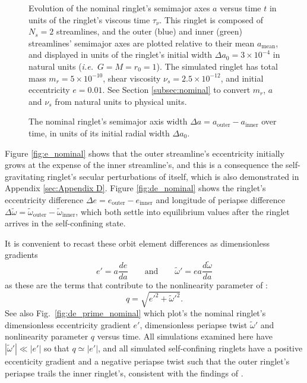 \documentclass[preprint]{aastex62}
\begin{document}
\begin{figure}
\caption{Evolution of the nominal ringlet's semimajor axes $a$
versus time $t$ in units of the ringlet's viscous time $\tau_\nu$.
This ringlet is composed of $N_s=2$ streamlines,
and the outer (blue) and inner (green) streamlines' semimajor axes are plotted relative
to their mean $a_{\text{mean}}$, and displayed in units of the ringlet's
initial width $\Delta a_0 = 3\times10^{-4}$ in natural units ({\it i.e.}\ $G=M=r_0=1$).
The simulated ringlet has total mass $m_r=5\times10^{-10}$, shear viscosity $\nu_s=2.5\times10^{-12}$,
and initial eccentricity $e=0.01$. See Section \ref{subsec:nominal} to convert
$m_r$, $a$ and $\nu_s$ from natural units to physical units.
\label{fig:a_nominal}}
\end{figure}

\begin{figure}
\caption{
\label{fig:da_nominal}
The nominal ringlet's semimajor axis width $\Delta a = a_{\text{outer}} - a_{\text{inner}}$ over time, 
in units of its initial radial width $\Delta a_0$.}
\end{figure}

Figure \ref{fig:e_nominal} shows that the outer streamline's eccentricity initially grows at the
expense of the inner streamline's, and this is a consequence the self-gravitating ringlet's
secular perturbations of itself, which is also demonstrated in Appendix \ref{sec:Appendix D}. 
Figure \ref{fig:de_nominal} shows
the ringlet's eccentricity difference $\Delta e = e_{\text{outer}} - e_{\text{inner}}$
and longitude of periapse difference
$\Delta\tilde{\omega} = \tilde{\omega}_{\text{outer}} - \tilde{\omega}_{\text{inner}}$,
which both settle into equilibrium values after the ringlet arrives in the self-confining
state.

It is convenient to recast these orbit element differences as dimensionless gradients
\begin{equation}
    \label{eqn:e_prime}
    e' = a\frac{de}{da}
    \qquad\mbox{and}\qquad
    \tilde{\omega}' = ea\frac{d\tilde{\omega}}{da}
\end{equation}
as these are the terms that contribute to the nonlinearity parameter of \cite{BGT83}:
\begin{equation}
    \label{eqn:q}
    q = \sqrt{e'^2 + \tilde{\omega}'^2}.
\end{equation}
See also Fig.\ \ref{fig:de_prime_nominal} which plot's the nominal
ringlet's dimensionless eccentricity gradient $e'$, dimensionless periapse twist $\tilde{\omega}'$
and nonlinearity parameter $q$ versus time. All simulations examined here have
$|\tilde{\omega}'|\ll|e'|$ so that $q\simeq|e'|$, and all simulated self-confining ringlets
have a positive eccenticity gradient and a negative periapse twist such that
the outer ringlet's periapse trails the inner ringlet's, consistent with the findings of
\cite{BGT83}.\vfil
\end{document}

